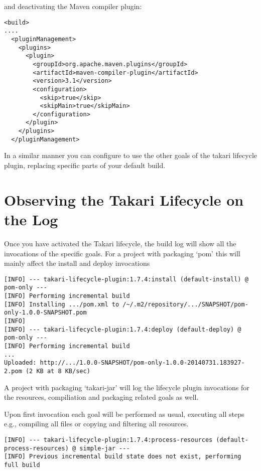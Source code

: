 \documentclass[a4paper]{book}
\begin{document}
and deactivating the Maven compiler plugin:

\begin{shaded}\begin{verbatim}
<build>
....
  <pluginManagement>
    <plugins>
      <plugin>
        <groupId>org.apache.maven.plugins</groupId>
        <artifactId>maven-compiler-plugin</artifactId>
        <version>3.1</version>
        <configuration>
          <skip>true</skip>
          <skipMain>true</skipMain>
        </configuration>
      </plugin>
    </plugins>
  </pluginManagement>
\end{verbatim}\end{shaded}

In a similar manner you can configure to use the other goals of the takari lifecycle plugin, replacing specific parts of your default build.

\section{Observing the Takari Lifecycle on the Log}\label{observing-the-takari-lifecycle-on-the-log}

Once you have activated the Takari lifecycle, the build log will show all the invocations of the specific goals. For a project with packaging `pom' this will mainly affect the install and deploy invocations

\begin{shaded}\begin{verbatim}
[INFO] --- takari-lifecycle-plugin:1.7.4:install (default-install) @ pom-only ---
[INFO] Performing incremental build
[INFO] Installing .../pom.xml to /~/.m2/repository/.../SNAPSHOT/pom-only-1.0.0-SNAPSHOT.pom
[INFO]
[INFO] --- takari-lifecycle-plugin:1.7.4:deploy (default-deploy) @ pom-only ---
[INFO] Performing incremental build
...
Uploaded: http://.../1.0.0-SNAPSHOT/pom-only-1.0.0-20140731.183927-2.pom (2 KB at 8 KB/sec)
\end{verbatim}\end{shaded}

A project with packaging `takari-jar' will log the lifecycle plugin invocations for the resources, compiliation and packaging related goals as well.

Upon first invocation each goal will be performed as usual, executing all steps e.g., compiling all files or copying and filtering all resources.

\begin{shaded}\begin{verbatim}
[INFO] --- takari-lifecycle-plugin:1.7.4:process-resources (default-process-resources) @ simple-jar ---
[INFO] Previous incremental build state does not exist, performing full build
\end{verbatim}\end{shaded}
\end{document}
